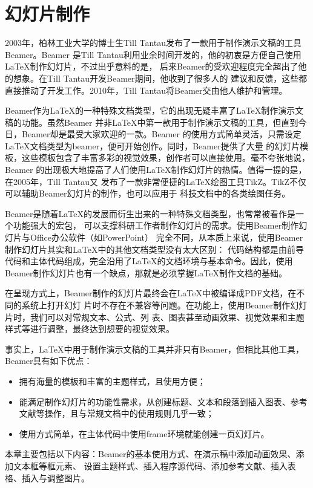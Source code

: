 \chapter{幻灯片制作}

2003年，柏林工业大学的博士生Till Tantau发布了一款用于制作演示文稿的工具Beamer。Beamer
是Till Tantau利用业余时间开发的，他的初衷是方便自己使用LaTeX制作幻灯片，不过出乎意料的是，
后来Beamer的受欢迎程度完全超出了他的想象。在Till Tantau开发Beamer期间，他收到了很多人的
建议和反馈，这些都直接推动了开发工作。2010年，Till Tantau将Beamer交由他人维护和管理。

Beamer作为LaTeX的一种特殊文档类型，它的出现无疑丰富了LaTeX制作演示文稿的功能。虽然Beamer
并非LaTeX中第一款用于制作演示文稿的工具，但直到今日，Beamer却是最受大家欢迎的一款。Beamer
的使用方式简单灵活，只需设定LaTeX文档类型为beamer，便可开始创作。同时，Beamer提供了大量
的幻灯片模板，这些模板包含了丰富多彩的视觉效果，创作者可以直接使用。毫不夸张地说，Beamer
的出现极大地提高了人们使用LaTeX制作幻灯片的热情。值得一提的是，在2005年，Till Tantau又
发布了一款非常便捷的LaTeX绘图工具TikZ。TikZ不仅可以辅助Beamer幻灯片的制作，也可以应用于
科技文档中的各类绘图任务。

Beamer是随着LaTeX的发展而衍生出来的一种特殊文档类型，也常常被看作是一个功能强大的宏包，
可以支撑科研工作者制作幻灯片的需求。使用Beamer制作幻灯片与Office办公软件（如PowerPoint）
完全不同，从本质上来说，使用Beamer制作幻灯片其实和LaTeX中的其他文档类型没有太大区别：
代码结构都是由前导代码和主体代码组成，完全沿用了LaTeX的文档环境与基本命令。因此，使用
Beamer制作幻灯片也有一个缺点，那就是必须掌握LaTeX制作文档的基础。

在呈现方式上，Beamer制作的幻灯片最终会在LaTeX中被编译成PDF文档，在不同的系统上打开幻灯
片时不存在不兼容等问题。在功能上，使用Beamer制作幻灯片时，我们可以对常规文本、公式、列
表、图表甚至动画效果、视觉效果和主题样式等进行调整，最终达到想要的视觉效果。

事实上，LaTeX中用于制作演示文稿的工具并非只有Beamer，但相比其他工具，Beamer具有如下优点：
\begin{itemize}
    \item 拥有海量的模板和丰富的主题样式，且使用方便；
    \item 能满足制作幻灯片的功能性需求，从创建标题、文本和段落到插入图表、参考文献等操作，且与常规文档中的使用规则几乎一致；
    \item 使用方式简单，在主体代码中使用frame环境就能创建一页幻灯片。
\end{itemize}

本章主要包括以下内容：Beamer的基本使用方式、在演示稿中添加动画效果、添加文本框等框元素、
设置主题样式、插入程序源代码、添加参考文献、插入表格、插入与调整图片。

